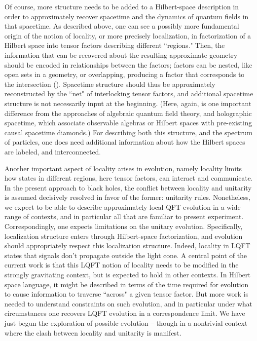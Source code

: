 Of course, more structure needs to be added to a Hilbert-space description in order to approximately recover spacetime and the dynamics of quantum fields in that spacetime.  As described above, one can see a possibly more fundamental origin of the notion of locality, or more precisely localization, in factorization of a Hilbert space into tensor factors describing different ``regions."  Then, the information that can be recovered about the resulting approximate geometry should be encoded in relationships between the factors; factors can be nested, like open sets in a geometry, or overlapping, producing a factor that corresponds to the intersection (\Tensfact).  
Spacetime structure should thus be approximately reconstructed by the ``net" of interlocking tensor factors, and additional spacetime structure is not necessarily input at the beginning.  (Here, again, is one important difference from the approaches of algebraic quantum field theory\Haag, and holographic spacetime\BanksHST, which associate observable algebras or Hilbert spaces with pre-existing causal spacetime diamonds.)  For describing both this structure, and the spectrum of particles, one does need additional information about how the Hilbert spaces are labeled, and interconnected.

Another important aspect of locality arises in evolution, namely locality limits how states in different regions, here tensor factors, can interact and communicate.  In the present approach to black holes, the conflict between locality and unitarity is assumed decisively resolved in favor of the former: unitarity rules.  Nonetheless, we expect to be able to describe approximately local QFT evolution in a wide range of contexts, and in particular all that are familiar to present experiment.  Correspondingly, one expects limitations on the unitary evolution.  Specifically, localization structure enters through Hilbert-space factorization, and evolution should appropriately respect this localization structure.
Indeed, locality in LQFT states that signals don't propagate outside the light cone.  A central point of the current work is that this LQFT notion of locality needs to be modified in the strongly gravitating context, but is expected to hold in other contexts.  In Hilbert space language, it might be described in terms of the time required for evolution  to cause information to traverse ``across" a given tensor factor.  But more work is needed to understand constraints on such evolution, and in particular under what circumstances one recovers LQFT evolution in a correspondence limit.  We have just begun the exploration of possible evolution -- though in a nontrivial context where the clash between locality and unitarity is manifest.

